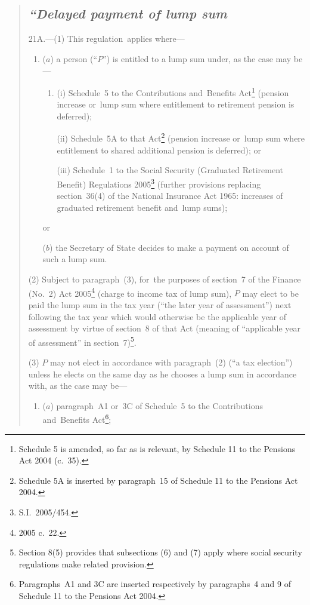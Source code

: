 \documentclass[12pt,a4paper]{article}
\begin{document}
\begin{quotation}
\subsection*{\itshape “Delayed payment of lump sum}

21A.---(1)   This regulation~applies where—
\begin{enumerate}\item[]
($a$) a person (“$P$”) is entitled to a lump sum under, as the case may be—
\begin{enumerate}\item[]
(i) Schedule~5 to the Contributions and~Benefits Act\footnote{Schedule 5 is amended, so far as is relevant, by Schedule 11 to the Pensions Act 2004 (c.~35).} (pension increase or~lump sum where entitlement to retirement pension is deferred);

(ii) Schedule~5A to that Act\footnote{Schedule 5A is inserted by paragraph~15 of Schedule 11 to the Pensions Act 2004.} (pension increase or~lump sum where entitlement to shared additional pension is deferred); or

(iii) Schedule~1 to the Social Security (Graduated Retirement Benefit) Regulations 2005\footnote{S.I.~2005/454.} (further provisions replacing section~36(4) of the National Insurance Act 1965: increases of graduated retirement benefit and~lump sums);
\end{enumerate}
or

($b$) the Secretary of State decides to make a payment on account of such a lump sum.
\end{enumerate}

(2) Subject to paragraph~(3), for~the purposes of section~7 of the Finance (No.~2) Act 2005\footnote{2005 c.~22.} (charge to income tax of lump sum), $P$ may elect to be paid the lump sum in the tax year (“the later year of assessment”) next following the tax year which would otherwise be the applicable year of assessment by virtue of section~8 of that Act (meaning of “applicable year of assessment” in section~7)\footnote{Section 8(5) provides that subsections (6) and (7) apply where social security regulations make related provision.}.

(3) $P$ may not elect in accordance with paragraph~(2) (“a tax election”) unless he elects on the same day as he chooses a lump sum in accordance with, as the case may be—
\begin{enumerate}\item[]
($a$) paragraph~A1 or~3C of Schedule~5 to the Contributions and~Benefits Act\footnote{Paragraphs~A1 and 3C are inserted respectively by paragraphs~4 and 9 of Schedule 11 to the Pensions Act 2004.};


\end{enumerate}
\end{quotation}
\end{document}
